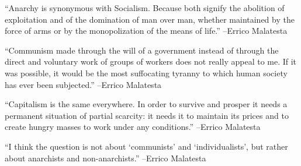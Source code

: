 \documentclass{article}%
\begin{document}
\vspace{1mm}%
\begin{minipage}{\textwidth}%
\flushleft%
“Anarchy is synonymous with Socialism. Because both signify the abolition of exploitation and of the domination of man over man, whether maintained by the force of arms or by the monopolization of the means of life.”%
\linebreak%
\vspace{1mm}%
–Errico Malatesta%
\linebreak%
\vspace{1mm}%
\end{minipage}%
\linebreak%
\vspace{1mm}%
\begin{minipage}{\textwidth}%
\flushleft%
“Communism made through the will of a government instead of through the direct and voluntary work of groups of workers does not really appeal to me. If it was possible, it would be the most suffocating tyranny to which human society has ever been subjected.”%
\linebreak%
\vspace{1mm}%
–Errico Malatesta%
\linebreak%
\vspace{1mm}%
\end{minipage}%
\linebreak%
\vspace{1mm}%
\begin{minipage}{\textwidth}%
\flushleft%
“Capitalism is the same everywhere. In order to survive and prosper it needs a permanent situation of partial scarcity: it needs it to maintain its prices and to create hungry masses to work under any conditions.”%
\linebreak%
\vspace{1mm}%
–Errico Malatesta%
\linebreak%
\vspace{1mm}%
\end{minipage}%
\linebreak%
\vspace{1mm}%
\begin{minipage}{\textwidth}%
\flushleft%
“I think the question is not about ‘communists’ and ‘individualists’, but rather about anarchists and non{-}anarchists.”%
\linebreak%
\vspace{1mm}%
–Errico Malatesta%
\linebreak%
\vspace{1mm}%
\end{minipage}%
\end{document}
